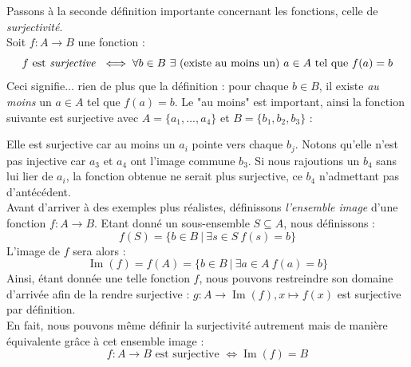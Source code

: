 \documentclass{article}
\DeclareMathOperator{\Ima}{Im}
\begin{document}
\noindent Passons à la seconde définition importante concernant les fonctions, celle de \textit{surjectivité}.\\
Soit $f: A \to B$ une fonction :
$$f \text{ est \textit{surjective} } \iff \forall b \in B \ \exists \text{ (existe au moins un) }a \in A \text{ tel que } f(a) = b
$$
Ceci signifie... rien de plus que la définition : pour chaque $b \in B$, il existe \textit{au moins} un $a \in A$ tel que $f(a) = b$. Le "au moins" est important, ainsi la fonction suivante est surjective avec $A = \{a_1, ..., a_4\}$ et $B = \{b_1, b_2, b_3\}$ :

\begin{center}
\end{center}
Elle est surjective car au moins un $a_i$ pointe vers chaque $b_j$. Notons qu'elle n'est pas injective car $a_3$ et $a_4$ ont l'image commune $b_3$. Si nous rajoutions un $b_4$ sans lui lier de $a_i$, la fonction obtenue ne serait plus surjective, ce $b_4$ n'admettant pas d'antécédent.\\

\noindent Avant d'arriver à des exemples plus réalistes, définissons \textit{l'ensemble image} d'une fonction $f: A \to B$. Etant donné un sous-ensemble $S \subseteq A$, nous définissons : 
$$f(S) = \{b \in B \ | \ \exists s  \in S  \ f(s) = b\}
$$
L'image de $f$ sera alors :
$$\Ima(f) = f(A) = \{ b \in B \ | \ \exists a \in A \ f(a) = b \}
$$
Ainsi, étant donnée une telle fonction $f$, nous pouvons restreindre son domaine d'arrivée afin de la rendre surjective : $g: A \to \Ima(f), x \mapsto f(x)$ est surjective par définition.\\

\noindent En fait, nous pouvons même définir la surjectivité autrement mais de manière équivalente grâce à cet ensemble image :
$$f: A \to B \text{ est surjective } \iff \Ima(f) = B
$$
\end{document}

